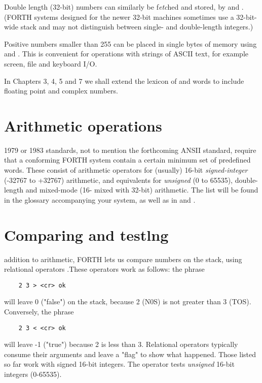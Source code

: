 Double length (32-bit) numbers can similarly be f\textit{etc}hed and stored, by  and  . (FORTH systems designed for the newer 32-bit machines sometimes use a 32-bit-wide stack and may not distinguish between single- and double-length integers.)

Positive numbers smaller than 255 can be placed in single bytes of memory using  and . This is convenient for operations with strings of ASCII text, for example screen, file and keyboard I/O.

In Chapters 3, 4, 5 and 7 we shall extend the lexicon of  and \bc{!} words to include floating point and complex numbers.

\section{Arithmetic operations}

 1979 or 1983 standards, not to mention the forthcoming ANSII standard, require that a conforming FORTH system contain a certain minimum set of predefined words. These consist of arithmetic operators  for (usually) 16-bit \textit{signed-integer} (-32767 to +32767) arithmetic, and equivalents for \textit{unsigned} (0 to 65535), double-length and mixed-mode (16- mixed with 32-bit) arithmetic. The list will be found in the glossary accompanying your system, as well as in \SF and \FTR.

\section{Comparing and testlng}

 addition to arithmetic, FORTH lets us compare numbers on the stack, using relational operators \bc{> < =}.These operators work as follows: the phrase

\begin{lstlisting}
    2 3 > <cr> ok
\end{lstlisting}

will leave 0 ("false") on the stack, because 2 (N0S) is not greater
than 3 (TOS). Conversely, the phrase

\begin{lstlisting}
    2 3 < <cr> ok
\end{lstlisting}

will leave -1 ("true") because 2 is less than 3. Relational operators typically consume their arguments and leave a "flag" to show what happened. Those listed so far work with signed 16-bit integers. The operator  tests \textit{unsigned} 16-bit integers (0-65535).

